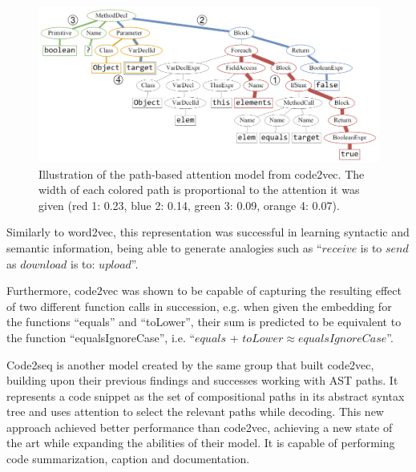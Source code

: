 \begin{figure}[!ht]
\centerline{\includegraphics[width=\textwidth]{figuras/code2vecpaths.png}}
\caption{Illustration of the path-based attention model from code2vec. The width of each colored path is proportional to the attention it was given (red 1: 0.23, blue 2: 0.14, green 3: 0.09, orange 4: 0.07). \citep{code2vec}}
\label{fig:code2vec}
\end{figure}

Similarly to word2vec, this representation was successful in learning syntactic and semantic information, being able to generate analogies such as ``$receive$ is to $send$ as $download$ is to: $upload$''. 

Furthermore, code2vec was shown to be capable of capturing the resulting effect of two different function calls in succession, e.g. when given the embedding for the functions ``equals'' and ``toLower'', their sum is predicted to be equivalent to the function ``equalsIgnoreCase'', i.e. ``$equals$ + $toLower \approx  equalsIgnoreCase$''. %


Code2seq \citep{code2seq} is another model created by the same group that built code2vec, building upon their previous findings and successes working with AST paths. It represents a code snippet as the set of compositional paths in its abstract syntax tree and uses attention to select the relevant paths while decoding.
This new approach achieved better performance than code2vec, achieving a new state of the art while expanding the abilities of their model. It is capable of performing code summarization, caption and documentation. 







